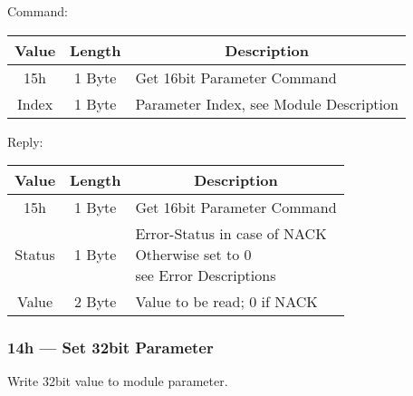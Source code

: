 Command:
\begin{table}[H]
    \centering
    \begin{tabular}{|c|c|l|}
        \hline
        \textbf{Value}   &   \textbf{Length} & \multicolumn{1}{|c|}{\textbf{Description}}\\ \hline \hline
        15h   &  1 Byte & Get 16bit Parameter Command \\ \hline
        Index & 1 Byte  & Parameter Index, see Module Description \\ \hline
    \end{tabular}
\label{tab:CAN-15-C}
\end{table}
Reply:
\begin{table}[H]
    \centering
    \begin{tabular}{|c|c|l|}
        \hline
        \textbf{Value}   &   \textbf{Length} & \multicolumn{1}{|c|}{\textbf{Description}}\\ \hline \hline
        15h   &  1 Byte & Get 16bit Parameter Command \\ \hline
        Status & 1 Byte & \makecell[l]{Error-Status in case of NACK \\ Otherwise set to 0\\see Error Descriptions}\\ \hline
        Value & 2 Byte & Value to be read; 0 if NACK \\ \hline
    \end{tabular}
\label{tab:CAN-15-R}
\end{table}

\subsubsection{14h --- Set 32bit Parameter}
Write 32bit value to module parameter.

